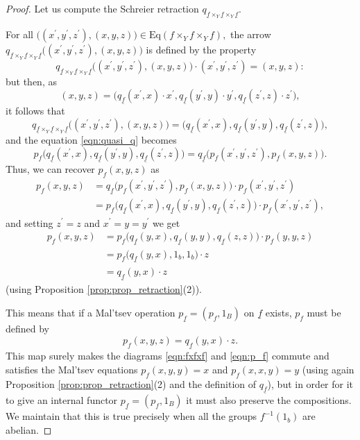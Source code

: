 \documentclass[11pt]{amsart}
\theoremstyle{plain}
\theoremstyle{definition}
\theoremstyle{remark}
\newcommand{\un}{\underline}
\begin{document}
\begin{proof}
Let us compute the Schreier retraction $q_{\un{f}\times_Y\un{f}\times_Y\un{f}}.$

For all $\big((x^\prime,y^\prime,z^\prime),(x,y,z)\big)\in\mathrm{Eq}(f\times_Yf\times_Yf),$ the arrow $q_{\un{f}\times_Y\un{f}\times_Y\un{f}}\big((x^\prime,y^\prime,z^\prime),(x,y,z)\big)$ is defined by the property
\[
q_{\un{f}\times_Y\un{f}\times_Y\un{f}}\big((x^\prime,y^\prime,z^\prime),(x,y,z)\big)\cdot (x^\prime,y^\prime,z^\prime)=(x,y,z):
\]
but then, as
\[
(x,y,z)=\big(q_{\un{f}}(x^\prime,x)\cdot x^\prime,q_{\un{f}}(y^\prime,y)\cdot y^\prime,q_{\un{f}}(z^\prime,z)\cdot z^\prime\big),
\]
it follows that
\[
q_{\un{f}\times_Y\un{f}\times_Y\un{f}}\big((x^\prime,y^\prime,z^\prime),(x,y,z)\big)=\big(q_{\un{f}}(x^\prime,x),q_{\un{f}}(y^\prime,y),q_{\un{f}}(z^\prime,z)\big),
\]
and the equation \eqref{eqn:quasi_q} becomes
\begin{equation}
\label{eqn:real_q}
p_f\big(q_{\un{f}}(x^\prime,x),q_{\un{f}}(y^\prime,y),q_{\un{f}}(z^\prime,z)\big)=q_{\un{f}}\big(p_f(x^\prime,y^\prime,z^\prime),p_f(x,y,z)\big).
\end{equation}
Thus, we can recover $p_f(x,y,z)$ as
\begin{equation*}
\begin{split}
p_f(x,y,z)&=q_{\un{f}}\big(p_f(x^\prime,y^\prime,z^\prime),p_f(x,y,z)\big)\cdot p_f(x^\prime,y^\prime,z^\prime)\\
&=p_f\big(q_{\un{f}}(x^\prime,x),q_{\un{f}}(y^\prime,y),q_{\un{f}}(z^\prime,z)\big)\cdot p_f(x^\prime,y^\prime,z^\prime),
\end{split}
\end{equation*}
and setting $z^\prime=z$ and $x^\prime=y=y^\prime$ we get
\begin{equation*}
\begin{split}
p_f(x,y,z)&=p_f\big(q_{\un{f}}(y,x),q_{\un{f}}(y,y),q_{\un{f}}(z,z)\big)\cdot p_f(y,y,z)\\
&=p_f\big(q_{\un{f}}(y,x),1_b,1_b\big)\cdot z\\
&=q_{\un{f}}(y,x)\cdot z
\end{split}
\end{equation*}
(using Proposition \ref{prop:prop_retraction}(2)).

This means that if a Mal'tsev operation $p_{\un{f}}=(p_f,1_B)$ on $\un{f}$ exists, $p_f$ must be defined by
\begin{equation}
\label{eqn:eq_p}
p_f(x,y,z)=q_{\un{f}}(y,x)\cdot z.
\end{equation}
This map surely makes the diagrams \eqref{eqn:fxfxf} and \eqref{eqn:p_f} commute and satisfies the Mal'tsev equations $p_f(x,y,y)=x$ and $p_f(x,x,y)=y$ (using again Proposition \ref{prop:prop_retraction}(2) and the definition of $q_{\un{f}}$), but in order for it to give an internal functor $p_{\un{f}}=(p_f,1_B)$ it must also preserve the compositions. We maintain that this is true precisely when all the groups $f^{-1}(1_b)$ are abelian.


\end{proof}
\end{document}
